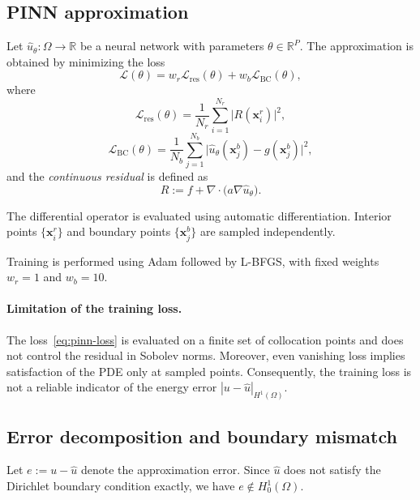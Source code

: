 \subsection{PINN approximation}

Let $\hat{u}_\theta : \Omega \to \mathbb{R}$ be a neural network with parameters
$\theta \in \mathbb{R}^P$. The approximation is obtained by minimizing the loss
\begin{equation}\label{eq:pinn-loss}
\mathcal{L}(\theta)
= w_r \mathcal{L}_{\mathrm{res}}(\theta)
+ w_b \mathcal{L}_{\mathrm{BC}}(\theta),
\end{equation}
where
\begin{equation}
\mathcal{L}_{\mathrm{res}}(\theta)
= \frac{1}{N_r} \sum_{i=1}^{N_r}
\bigl| R(\bm{x}_i^r) \bigr|^2,
\end{equation}
\begin{equation}
\mathcal{L}_{\mathrm{BC}}(\theta)
= \frac{1}{N_b} \sum_{j=1}^{N_b}
\bigl| \hat{u}_\theta(\bm{x}_j^b) - g(\bm{x}_j^b) \bigr|^2,
\end{equation}
and the \emph{continuous residual} is defined as
\begin{equation}\label{eq:residual}
R := f + \nabla \cdot \bigl(a \nabla \hat{u}_\theta\bigr).
\end{equation}

The differential operator is evaluated using automatic differentiation.
Interior points $\{\bm{x}_i^r\}$ and boundary points $\{\bm{x}_j^b\}$ are sampled
independently.

Training is performed using Adam followed by L-BFGS, with fixed weights
$w_r = 1$ and $w_b = 10$.

\paragraph{Limitation of the training loss.}
The loss~\eqref{eq:pinn-loss} is evaluated on a finite set of collocation points
and does not control the residual in Sobolev norms. Moreover, even vanishing
loss implies satisfaction of the PDE only at sampled points.
Consequently, the training loss is not a reliable indicator of the energy error
$|u - \hat{u}|_{H^1(\Omega)}$.

\subsection{Error decomposition and boundary mismatch}

Let $e := u - \hat{u}$ denote the approximation error.
Since $\hat{u}$ does not satisfy the Dirichlet boundary condition exactly,
we have $e \notin H^1_0(\Omega)$.

